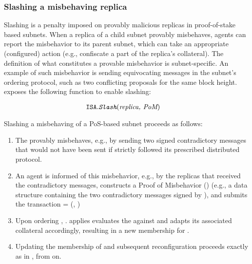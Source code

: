 \subsubsection{Slashing a misbehaving replica}
\label{sec:slash}
Slashing is a penalty imposed on provably malicious replicas in proof-of-stake based subnets.
When a replica of a child subnet provably misbehaves, \ipc agents can report the misbehavior to its parent subnet,
which can take an appropriate (configured) action (e.g., confiscate a part of the replica's collateral).
The definition of what constitutes a provable misbehavior is subnet-specific.
An example of such misbehavior is sending equivocating messages in the subnet's ordering protocol, such as two conflicting proposals for the same block height.
\ipc exposes the following function to enable slashing:

\begin{align*}
    \texttt{ISA}.&\textit{\texttt{Slash}}(\textit{replica, PoM})
\end{align*}

Slashing a misbehaving  of a PoS-based subnet  proceeds as follows:

\begin{enumerate}
    
    \item The  provably misbehaves, e.g., by sending two signed contradictory messages
    that would not have been sent if  strictly followed its prescribed distributed protocol.

    \item An \ipc agent is informed of this misbehavior, e.g., by the replicas that received the contradictory messages,
    constructs a Proof of Misbehavior () (e.g., a data structure containing the two contradictory messages signed by ),
    and submits the transaction  = (, )

    \item Upon ordering , . applies evaluates the  against 
    and adapts its associated collateral accordingly, resulting in a new membership for .

    \item Updating the membership of  and subsequent reconfiguration proceeds exactly as in , from  on.

\end{enumerate}

